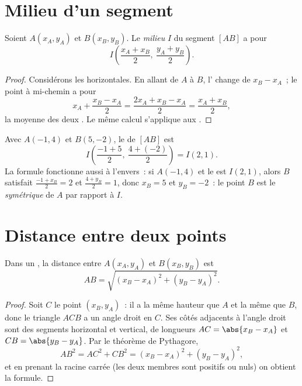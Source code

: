 \section{Milieu d'un segment}

\begin{proposition}\label{prop:g10:coordgeom:midpoint}
Soient $A(x_A, y_A)$ et $B(x_B, y_B)$. Le \emph{milieu}
$I$ du segment $[AB]$ a pour 
\[
I\left(\frac{x_A + x_B}{2},\ \frac{y_A + y_B}{2}\right).
\]
\end{proposition}

\begin{proof}
Considérons les  horizontales. En allant de $A$ à $B$,
l' change de $x_B - x_A$~; le point à mi-chemin a pour 
\[
x_A + \frac{x_B - x_A}{2} = \frac{2x_A + x_B - x_A}{2}
= \frac{x_A + x_B}{2},
\]
la moyenne des deux . Le même calcul s'applique aux .
\end{proof}

\begin{example}\label{ex:g10:coordgeom:midpoint}
Avec $A(-1, 4)$ et $B(5, -2)$, le  de $[AB]$ est
\[
I\left(\frac{-1 + 5}{2},\ \frac{4 + (-2)}{2}\right) = I(2, 1).
\]
La formule fonctionne aussi à l'envers~: si $A(-1, 4)$ et le  est
$I(2, 1)$, alors $B$ satisfait $\frac{-1 + x_B}{2} = 2$ et
$\frac{4 + y_B}{2} = 1$, donc $x_B = 5$ et $y_B = -2$~: le point $B$ est
le \emph{symétrique} de $A$ par rapport à $I$.
\end{example}

\section{Distance entre deux points}

\begin{theorem}\label{thm:g10:coordgeom:distance}
Dans un , la distance entre $A(x_A, y_A)$ et
$B(x_B, y_B)$ est
\[
AB = \sqrt{(x_B - x_A)^2 + (y_B - y_A)^2}.
\]
\end{theorem}

\begin{proof}
Soit $C$ le point $(x_B, y_A)$~: il a la même hauteur que $A$ et la même
 que $B$, donc le triangle $ACB$ a un angle droit en $C$. Ses
côtés adjacents à l'angle droit sont des segments horizontal et vertical,
de longueurs $AC = \abs{x_B - x_A}$ et $CB = \abs{y_B - y_A}$. Par le
théorème de Pythagore,
\[
AB^2 = AC^2 + CB^2 = (x_B - x_A)^2 + (y_B - y_A)^2,
\]
et en prenant la racine carrée (les deux membres sont positifs ou nuls)
on obtient la formule.
\end{proof}

